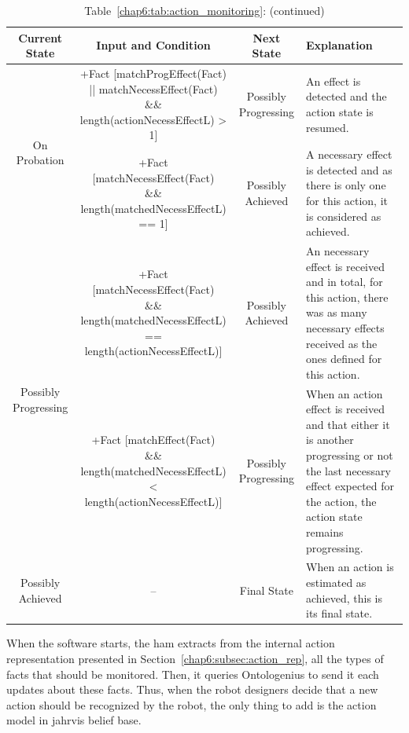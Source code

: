 \documentclass[a4paper,11pt,twoside]{StyleThese}
\begin{document}
\begin{landscape}
\begin{table}[htb!]
  	\caption*{Table~\ref{chap6:tab:action_monitoring}: (continued)}
	\begin{tabularx}{\linewidth}{| c | c | c | X |}
		Current State & Input and Condition & Next State & Explanation\\ 
		\hline \hline
		\multirow{2}{*}{On Probation} 
		& \makecell{+Fact [matchProgEffect(Fact)
			\\ || matchNecessEffect(Fact)
			\\ \&\& length(actionNecessEffectL) > 1]} & Possibly Progressing & An effect is detected and the action state is resumed.\\
		\cline{2-4}
		& \makecell{+Fact [matchNecessEffect(Fact) 
			\\ \&\& length(matchedNecessEffectL) == 1]} & Possibly Achieved 
		& A necessary effect is detected and as there is only one for this action, it is considered as achieved.\\
		\hline
		\multirow{2}{*}{Possibly Progressing} 
		& \makecell{+Fact [matchNecessEffect(Fact) 
			\\ \&\& length(matchedNecessEffectL)
			\\ == length(actionNecessEffectL)]} & Possibly Achieved 
		& An necessary effect is received and in total, for this action, there was as many necessary effects received as the ones defined for this action.\\
		\cline{2-4}
		& \makecell{+Fact [matchEffect(Fact) 
			\\ \&\& length(matchedNecessEffectL)
			\\ < length(actionNecessEffectL)]} & Possibly Progressing 
		& When an action effect is received and that either it is another progressing or not the last necessary effect expected for the action, the action state remains progressing.\\  
		\hline
		Possibly Achieved & -- & Final State & When an action is estimated as achieved, this is its final state.\\
		\hline
	\end{tabularx}
	
\end{table}
\vspace*{\fill}
\end{landscape}

\restoregeometry

When the software starts, the \acrshort{ham} extracts from the internal action representation presented in Section~\ref{chap6:subsec:action_rep}, all the types of facts that should be monitored. Then, it queries Ontologenius to send it each updates about these facts. Thus, when the robot designers decide that a new action should be recognized by the robot, the only thing to add is the action model in \acrshort{jahrvis} belief base.
\end{document}
